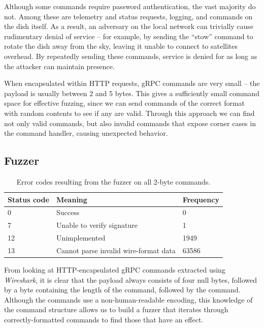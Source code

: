 Although some commands require password authentication, the vast majority do not.
Among these are telemetry and status requests, logging, and commands on the dish itself.
As a result, an adversary on the local network can trivially cause rudimentary denial of service -- for example, by sending the ``stow'' command to rotate the dish away from the sky, leaving it unable to connect to satellites overhead.
By repeatedly sending these commands, service is denied for as long as the attacker can maintain presence.

When encapsulated within HTTP requests, gRPC commands are very small -- the payload is usually between 2 and 5 bytes.
This gives a sufficiently small command space for effective fuzzing, since we can send commands of the correct format with random contents to see if any are valid.
Through this approach we can find not only valid commands, but also invalid commands that expose corner cases in the command handler, causing unexpected behavior.


\subsection{Fuzzer}\label{sec:fuzzer}

\begin{table}
    \centering
    \begin{tabular}{lll}
        \toprule
        Status code & Meaning & Frequency \\
        \midrule
        0  & Success                               & 0     \\
        7  & Unable to verify signature            & 1     \\
        12 & Unimplemented                         & 1949  \\
        13 & Cannot parse invalid wire-format data & 63586 \\
        \bottomrule
    \end{tabular}
\caption{Error codes resulting from the fuzzer on all 2-byte commands.}
\label{tab:fuzzer-results}
\end{table}

From looking at HTTP-encapsulated gRPC commands extracted using \textit{Wireshark}, it is clear that the payload always consists of four null bytes, followed by a byte containing the length of the command, followed by the command.
Although the commands use a non-human-readable encoding, this knowledge of the command structure allows us to build a fuzzer that iterates through correctly-formatted commands to find those that have an effect.

